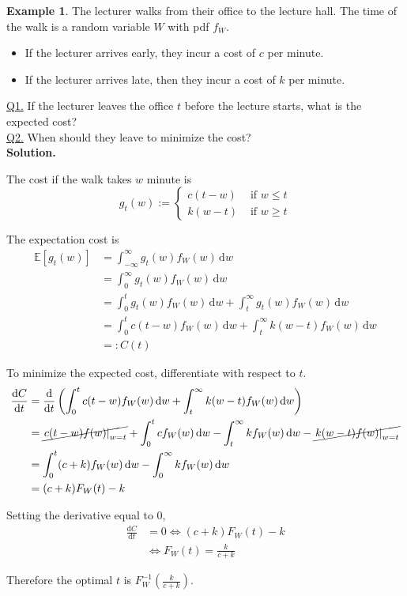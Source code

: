 \documentclass[a4paper,11pt]{amsbook}
\theoremstyle{definition}
\newtheorem{example}{\hspace{-2em} \color{darkblue} Example}[chapter]
\theoremstyle{remark}
\newcommand{\E}{\mathbb{E}}
\newcommand\0{\varnothing}
\newcommand\dt[1][t]{\,\mathrm{d}#1}
\newcommand\diff[2][]
{
    \frac{\mathrm{d}#1}{\mathrm{d}#2}
}
\begin{document}
    \begin{example}
        The lecturer walks from their office to the lecture hall.
        The time of the walk is a random variable $W$ with pdf $f_W$.
        \begin{itemize}
            \item If the lecturer arrives early, they incur a cost of $c$ per minute.
            \item If the lecturer arrives late, then they incur a cost of $k$ per minute.
        \end{itemize}
        \underline{Q1.} If the lecturer leaves the office $t$ before the lecture starts, what is the expected cost?\\
        \underline{Q2.} When should they leave to minimize the cost?\\
        \textbf{Solution.} %

        The cost if the walk takes $w$ minute is $$g_t(w):=\begin{cases}
            c(t-w) & \text{ if }w\leq t \\
            k(w-t) & \text{ if }w\geq t
        \end{cases}$$

        The expectation cost is \begin{align*}
            \E[g_t(w)]&=\int_{-\infty}^\infty g_t(w)f_W(w)\dt[w] \\
            &=\int_0^\infty g_t(w)f_W(w)\dt[w] \\
            &=\int_0^t g_t(w)f_W(w)\dt[w]+\int_t^\infty g_t(w)f_W(w)\dt[w] \\
            &=\int_0^t c(t-w)f_W(w)\dt[w]+\int_t^\infty k(w-t)f_W(w)\dt[w] \\
            &=:C(t)
        \end{align*}

        To minimize the expected cost, differentiate with respect to $t$.
        \begin{align*}
            \diff[C]{t}&=\diff{t}\left(\int_0^t c(t-w)f_W(w)\dt[w]+\int_t^\infty k(w-t)f_W(w)\dt[w]\right) \\
            &=\cancel{\left.c(t-w)f(w)\right|_{w=t}}+\int_0^t cf_W(w)\dt[w]-\int_t^\infty kf_W(w)\dt[w]-\cancel{\left.k(w-t)f(w)\right|_{w=t}} \\
            &=\int_0^t (c+k)f_W(w)\dt[w]-\int_0^\infty kf_W(w)\dt[w] \\
            &=(c+k)F_W(t)-k
        \end{align*}

        Setting the derivative equal to 0, \begin{align*}
            \diff[C]{t}&=0\iff(c+k)F_W(t)-k \\
            &\iff F_W(t)=\frac{k}{c+k}
        \end{align*}

        Therefore the optimal $t$ is $F_W^{-1}\left(\frac{k}{c+k}\right)$.
    \end{example}
\end{document}
